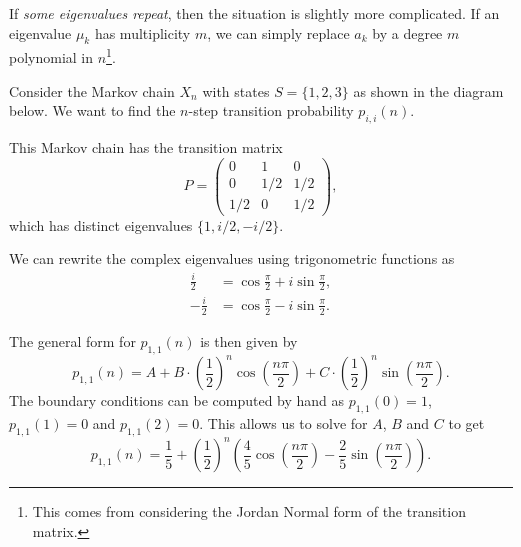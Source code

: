 \documentclass[a4paper]{scrartcl}
\begin{document}
If \emph{some eigenvalues repeat}, then the situation is slightly more complicated. If an eigenvalue $\mu_k$ has multiplicity $m$, we can simply replace $a_k$ by a degree $m$ polynomial in $n$\footnote{This comes from considering the Jordan Normal form of the transition matrix.}. 


\begin{example}
	Consider the Markov chain $X_n$ with states $S = \{1, 2, 3\}$ as shown in the diagram below. We want to find the $n$-step transition probability $p_{i, i}(n)$.
	\begin{center}
	\end{center}

	This Markov chain has the transition matrix
	$$
	P = \begin{pmatrix}
		0 & 1 & 0 \\
		0 & 1/2 & 1/2 \\ 
		1/2 & 0 & 1/2
	\end{pmatrix},
	$$
	which has distinct eigenvalues $\{1, i/2, -i/2\}$.

	We can rewrite the complex eigenvalues using trigonometric functions as
	\begin{align*}
		\frac{i}{2} &= \cos \frac{\pi}{2} + i \sin \frac{\pi}{2}, \\ 
		-\frac{i}{2} &= \cos \frac{\pi}{2} - i \sin \frac{\pi}{2}.
	\end{align*}

	The general form for $p_{1,1}(n)$ is then given by
	$$
	p_{1,1}(n) = A + B \cdot \left(\frac{1}{2}\right)^n \cos \left(\frac{n \pi}{2}\right) + C \cdot \left(\frac{1}{2}\right)^n \sin\left(\frac{n \pi}{2}\right).
	$$
	The boundary conditions can be computed by hand as
	$p_{1,1}(0) = 1$, $p_{1,1}(1) = 0$ and $p_{1,1}(2) = 0$. This allows us to solve for $A$, $B$ and $C$ to get
	$$
	p_{1,1}(n) = \frac{1}{5} + \left(\frac{1}{2}\right)^n \left(\frac{4}{5}\cos\left(\frac{n \pi}{2}\right) - \frac{2}{5} \sin \left(\frac{n \pi}{2}\right)\right).
	$$
\end{example}
\end{document}
